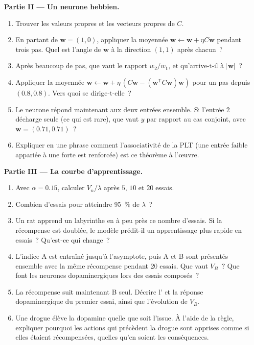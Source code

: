 \begin{problem}
\medskip
\noindent\textbf{Partie II --- Un neurone hebbien.}
\begin{enumerate}[resume]
  \item Trouver les valeurs propres et les vecteurs propres de $C$.
  \item En partant de $\mathbf{w} = (1, 0)$, appliquer la 
        moyennée $\mathbf{w} \leftarrow \mathbf{w} + \eta C\mathbf{w}$
        pendant trois pas. Quel est l'angle de $\mathbf{w}$ à la
        direction $(1,1)$ après chacun~?
  \item Après beaucoup de pas, que vaut le rapport $w_{2}/w_{1}$, et
        qu'arrive-t-il à $|\mathbf{w}|$~?
  \item Appliquer la  moyennée $\mathbf{w} \leftarrow \mathbf{w} +
        \eta\,(C\mathbf{w} - (\mathbf{w}^{\mathsf{T}}C\mathbf{w})
        \mathbf{w})$ pour un pas depuis $(0.8, 0.8)$. Vers quoi
        se dirige-t-elle~?
  \item Le neurone répond maintenant aux deux entrées ensemble. Si
        l'entrée 2 décharge seule (ce qui est rare), que vaut $y$ par
        rapport au cas conjoint, avec $\mathbf{w} = (0.71, 0.71)$~?
  \item Expliquer en une phrase comment l'associativité de la PLT (une
        entrée faible appariée à une forte est renforcée) est ce
        théorème à l'œuvre.
\end{enumerate}

\medskip
\noindent\textbf{Partie III --- La courbe d'apprentissage.}
\begin{enumerate}[resume]
  \item Avec $\alpha = 0.15$, calculer $V_{n}/\lambda$ après $5$, $10$
        et $20$ essais.
  \item Combien d'essais pour atteindre \qty{95}{\%} de $\lambda$~?
  \item Un rat apprend un labyrinthe en à peu près ce nombre d'essais.
        Si la récompense est doublée, le modèle prédit-il un
        apprentissage plus rapide en essais~? Qu'est-ce qui change~?
  \item L'indice A est entraîné jusqu'à l'asymptote, puis A et B sont
        présentés ensemble avec la même récompense pendant $20$ essais.
        Que vaut $V_{B}$~? Que font les neurones dopaminergiques lors
        des essais composés~?
  \item La récompense suit maintenant B seul. Décrire l' et la réponse dopaminergique du premier essai, ainsi
        que l'évolution de $V_{B}$.
  \item Une drogue élève la dopamine quelle que soit l'issue. À l'aide
        de la règle, expliquer pourquoi les actions qui précèdent la
        drogue sont apprises comme si elles étaient récompensées, quelles
        qu'en soient les conséquences.
\end{enumerate}


\end{problem}
